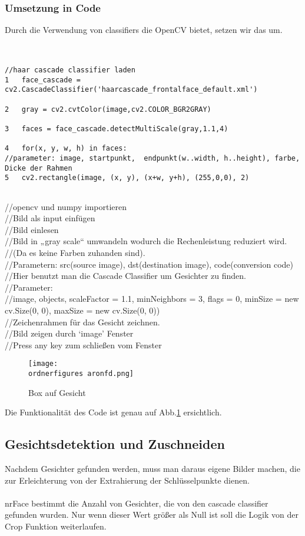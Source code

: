 \subsubsection{Umsetzung in Code}

Durch die Verwendung von classifiers die OpenCV bietet, setzen wir das um. \\\\
\begin{lstlisting}

//haar cascade classifier laden 
1	face_cascade = cv2.CascadeClassifier('haarcascade_frontalface_default.xml')

2	gray = cv2.cvtColor(image,cv2.COLOR_BGR2GRAY)

3	faces = face_cascade.detectMultiScale(gray,1.1,4)

4	for(x, y, w, h) in faces:
//parameter: image, startpunkt,  endpunkt(w..width, h..height), farbe, Dicke der Rahmen
5	cv2.rectangle(image, (x, y), (x+w, y+h), (255,0,0), 2) 


\end{lstlisting}
 //opencv und numpy importieren \\
//Bild als input einfügen\\
//Bild einlesen\\
//Bild in „gray scale“ umwandeln wodurch die Rechenleistung reduziert wird.
//(Da es keine Farben zuhanden sind).\\
//Parametern: src(source image), dst(destination image), code(conversion code)\\
//Hier benutzt man die Cascade Classifier um Gesichter zu finden.\\
//Parameter: \\
//image, objects, scaleFactor = 1.1, minNeighbors = 3, flags = 0, minSize = new cv.Size(0, 0), maxSize = new cv.Size(0, 0)) \\ 
//Zeichenrahmen für das Gesicht zeichnen.\\
//Bild zeigen durch ‘image’ Fenster \\
//Press any key zum schließen vom Fenster\\
\begin{figure}[H]
	\texttt{[image: \\ordnerfigures aronfd.png]}
	\caption{Box auf Gesicht}
	\label{fig:aron}
\end{figure}

Die Funktionalität des Code ist genau auf Abb.\ref{fig:aron} ersichtlich. \\

\subsection{Gesichtsdetektion und Zuschneiden}
Nachdem Gesichter gefunden werden, muss man daraus eigene Bilder machen, die zur Erleichterung von der Extrahierung der Schlüsselpunkte dienen.\\\\  
nrFace bestimmt die Anzahl von Gesichter, die von den cascade classifier gefunden wurden. 
Nur wenn dieser Wert größer als Null ist soll die Logik von der Crop Funktion weiterlaufen. \\

